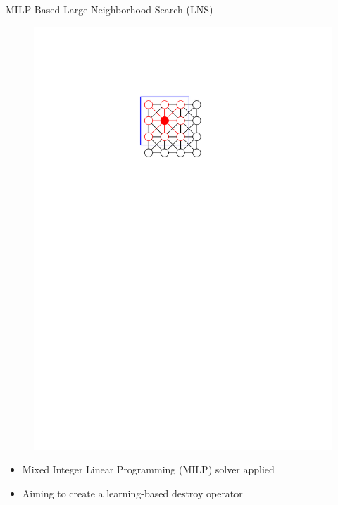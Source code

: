 \documentclass[aspectratio=1610]{beamer}
\newcommand{\important}[1]{{\color{green!60!black}#1}}
\begin{document}
\begin{frame}{MILP-Based Large Neighborhood Search (LNS)}
\begin{figure}
\begin{overprint}
			\centering\includegraphics[width=\textwidth, page=9]{graphics/graphics.pdf}
		\end{overprint}
	\end{figure}
	\begin{itemize}
		\item {} Mixed Integer Linear Programming (MILP) solver applied
		\item<2> Aiming to create a \important{learning-based destroy operator}
	\end{itemize}
\end{frame}

	
\end{document}
